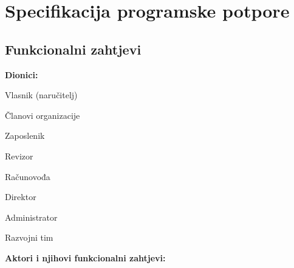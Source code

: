 \chapter{Specifikacija programske potpore}
		
	\section{Funkcionalni zahtjevi}
			
			\noindent \textbf{Dionici:}
			
			\begin{packed_enum}
				
				\item Vlasnik (naručitelj)
				\item Članovi organizacije
				
				\begin{packed_enum}
					\item Zaposlenik
					\item Revizor
					\item Računovođa
					\item Direktor
				\end{packed_enum}
				
				\item Administrator
				\item Razvojni tim
				
			\end{packed_enum}
			
			\noindent \textbf{Aktori i njihovi funkcionalni zahtjevi:}
			
